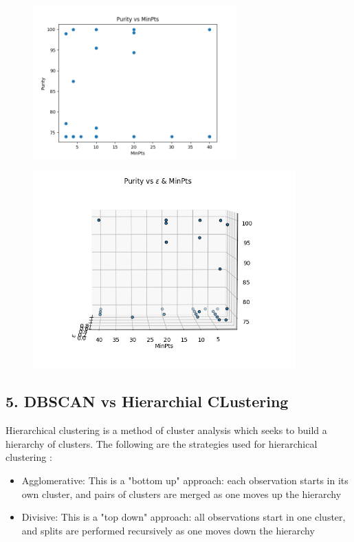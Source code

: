 \documentclass[paper=a4, fontsize=11pt]{scrartcl}
\numberwithin{equation}{section}		%
\numberwithin{figure}{section}			%
\numberwithin{table}{section}				%
\begin{document}
\begin{figure}[H]
	\centering
  \includegraphics[width=0.7\textwidth]{dbscan_3}\label{fig:f2}
\end{figure}

\begin{figure}[H]
	\centering
  \includegraphics[width=0.9\textwidth]{dbscan_5}\label{fig:f2}
\end{figure}


\subsection*{5. DBSCAN vs Hierarchial CLustering}
Hierarchical clustering is a method of cluster analysis which seeks to build a hierarchy of clusters. The following are the strategies used for hierarchical clustering :
\begin{itemize}
\item Agglomerative: This is a "bottom up" approach: each observation starts in its own cluster, and pairs of clusters are merged as one moves up the hierarchy
\item Divisive: This is a "top down" approach: all observations start in one cluster, and splits are performed recursively as one moves down the hierarchy
\end{itemize}
\end{document}
